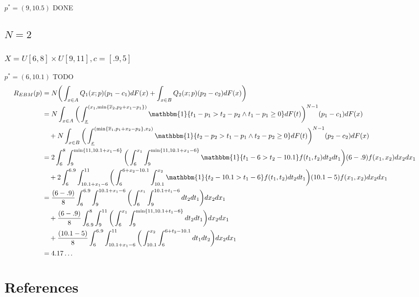 \documentclass{article}
\begin{document}
{\color{red}$p^* = (9,10.5)$ DONE}\\

\subsection{$N=2$}

\subsubsection{$X=U[6,8]\times U[9,11], c=[.9,5]$ \autocite{belloni2010multidimensional}}

{\color{red}$p^* = (6,10.1)$ TODO}\\
\begin{align}
    R_{EBM}(p) &= N \bigg( \int_{x \in A} Q_1(x;p)(p_1 - c_1)dF(x) + \int_{x \in B} Q_2(x;p)(p_2 - c_2)dF(x) \bigg) \\
        &= N \int_{x \in A} \bigg( \int_{\underline{x}}^{(x_1, \min\{\overline{x}_2, p_2 + x_1 - p_1 \})} \mathbbm{1}\{ t_1 - p_1 > t_2 - p_2 \land t_1 - p_1 \geq 0 \} dF(t) \bigg)^{N-1} (p_1 - c_1)dF(x) \\
            &\quad+ N \int_{x \in B} \bigg( \int_{\underline{x}}^{(\min\{\overline{x}_1, p_1 + x_2 - p_2 \},x_2)} \mathbbm{1}\{ t_2 - p_2 > t_1 - p_1 \land t_2 - p_2 \geq 0 \} dF(t) \bigg)^{N-1} (p_2 - c_2)dF(x) \\
        &= 2 \int_{6}^{8} \int_{9}^{\min\{11, 10.1 + x_1 - 6 \}} \bigg( \int_{6}^{x_1} \int_{9}^{\min\{11, 10.1 + x_1 - 6 \}} \mathbbm{1}\{ t_1 - 6 > t_2 - 10.1 \} f(t_1,t_2) dt_2 dt_1 \bigg) (6 - .9) f(x_1,x_2) dx_2 dx_1 \\
            &\quad+ 2 \int_{6}^{6.9} \int_{10.1 + x_1 - 6}^{11} \bigg( \int_6^{6 + x_2 - 10.1} \int_{10.1}^{x_2} \mathbbm{1}\{ t_2 - 10.1 > t_1 - 6 \} f(t_1,t_2) dt_2 dt_1 \bigg)(10.1 - 5) f(x_1,x_2) dx_2 dx_1 \\
        &= \frac{(6 - .9)}{8} \int_{6}^{6.9} \int_{9}^{10.1 + x_1 - 6} \bigg( \int_{6}^{x_1} \int_{9}^{10.1 + t_1 - 6} dt_2 dt_1 \bigg) dx_2 dx_1 \\
            &\quad+ \frac{(6 - .9)}{8} \int_{6.9}^{8} \int_9^{11} \bigg( \int_{6}^{x_1} \int_{9}^{\min\{11, 10.1 + t_1 - 6\}} dt_2 dt_1 \bigg) dx_2 dx_1 \\
            &\quad+ \frac{(10.1 - 5)}{8} \int_{6}^{6.9} \int_{10.1 + x_1 - 6}^{11} \bigg( \int_{10.1}^{x_2} \int_{6}^{6 + t_2 - 10.1} dt_1 dt_2 \bigg) dx_2 dx_1 \\
        &= 4.17\dots
\end{align}




\section{References}
\printbibliography[heading=none]
\end{document}
